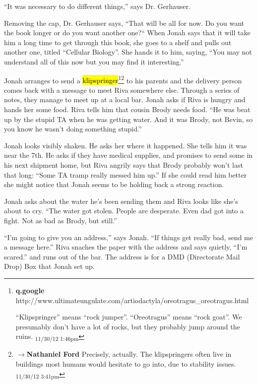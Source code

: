 ``It was necessary to do different things,'' says Dr. Gerhauser.



Removing the cap, Dr. Gerhauser says, ``That will be all for now.  Do you want the book longer or do you want another one?``  When Jonah says that it will take him a long time to get through this book, she goes to a shelf and pulls out another one, titled ``Cellular Biology''.  She hands it to him, saying, ``You may not understand all of this now but you may find it interesting.''




Jonah arranges to send a \hl{klipspringer}\footnote{\textbf{q.google }http://www.ultimateungulate.com/artiodactyla/oreotragus\_oreotragus.html

``Klipspringer'' means ``rock jumper''.  ``Oreotragus'' means ``rock goat''.  We presumably don't have a lot of rocks, but they probably jump around the ruins. \textsubscript{11/30/12 1:46pm}}\footnote{$\rightarrow$\textbf{Nathaniel Ford }Precisely, actually. The klipspringers often live in buildings most humans would hesitate to go into, due to stability issues. \textsubscript{11/30/12 3:41pm}} to his parents and the delivery person comes back with a message to meet Riva somewhere else.  Through a series of notes, they manage to meet up at a local bar.  Jonah asks if Riva is hungry and hands her some food.  Riva tells him that cousin Brody needs food. ``He was beat up by the stupid TA when he was getting water.  And it was Brody, not Bevin, so you know he wasn't doing something stupid.''



Jonah looks visibly shaken.  He asks her where it happened.  She tells him it was near the 7th.  He asks if they have medical supplies, and promises to send some in his next shipment home, but Riva angrily says that Brody probably won't last that long: ``Some TA tramp really messed him up.''  If she could read him better she might notice that Jonah seems to be holding back a strong reaction.



Jonah asks about the water he's been sending them and Riva looks like she's about to cry.  ``The water got stolen.  People are desperate.  Even dad got into a fight.  Not as bad as Brody, but still.''



``I'm going to give you an address,'' says Jonah. ``If things get really bad, send me a message here.''  Riva snaches the paper with the address and says quietly, ``I'm scared.'' and runs out of the bar.  The address is for a DMD (Directorate Mail Drop) Box that Jonah set up.



